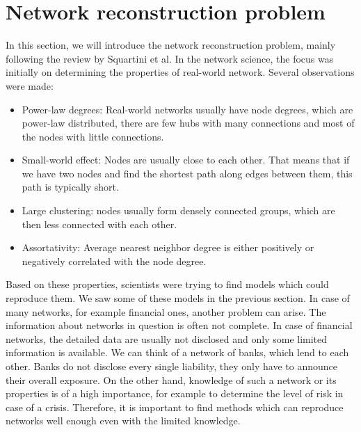 \section{Network reconstruction problem}
In this section, we will introduce the network reconstruction problem, mainly following the review by Squartini et al. \cite{Squartini2018}
In the network science, the focus was initially on determining the properties of real-world network. Several observations were made:
\begin{itemize}
    \item Power-law degrees: Real-world networks usually have node degrees, which are power-law distributed, there are few hubs with many connections and most of the nodes with little connections.
    \item Small-world effect: Nodes are usually close to each other. That means that if we have two nodes and find the shortest path along edges between them, this path is typically short.
    \item Large clustering: nodes usually form densely connected groups, which are then less connected with each other.
    \item Assortativity: Average nearest neighbor degree is either positively or negatively correlated with the node degree.
\end{itemize}

Based on these properties, scientists were trying to find models which could reproduce them. We saw some of these models in the previous section. In case of many networks, for example financial ones, another problem can arise. The information about networks in question is often not complete. In case of financial networks, the detailed data are usually not disclosed and only some limited information is available. We can think of a network of banks, which lend to each other. Banks do not disclose every single liability, they only have to announce their overall exposure. On the other hand, knowledge of such a network or its properties is of a high importance, for example to determine the level of risk in case of a crisis. Therefore, it is important to find methods which can reproduce networks well enough even with the limited knowledge. 

